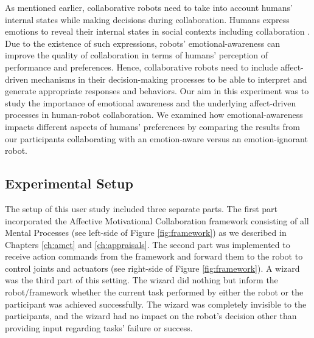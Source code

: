 \documentclass[12pt]{report}
\begin{document}
As mentioned earlier, collaborative robots need to take into account humans'
internal states while making decisions during collaboration. Humans express
emotions to reveal their internal states in social contexts including
collaboration \cite{breazeal:sociable-interactive-robots}. Due to the existence
of such expressions, robots' emotional-awareness can improve the quality of
collaboration in terms of humans' perception of performance and preferences.
Hence, collaborative robots need to include affect-driven mechanisms in their
decision-making processes to be able to interpret and generate appropriate
responses and behaviors. Our aim in this experiment was to study the importance
of emotional awareness and the underlying affect-driven processes in human-robot
collaboration. We examined how emotional-awareness impacts different aspects of
humans' preferences by comparing the results from our participants collaborating
with an emotion-aware versus an emotion-ignorant robot.

% 
% 
% 
% 
\subsection{Experimental Setup}
The setup of this user study included three separate parts. The first
part incorporated the Affective Motivational Collaboration framework consisting
of all Mental Processes (see left-side of Figure \ref{fig:framework}) as we
described in Chapters \ref{ch:amct} and \ref{ch:appraisals}. The second part was
implemented to receive action commands from the framework and forward them to
the robot to control joints and actuators (see right-side of Figure
\ref{fig:framework}). A wizard was the third part of this setting. The wizard
did nothing but inform the robot/framework whether the current task performed by
either the robot or the participant was achieved successfully. The wizard was
completely invisible to the participants, and the wizard had no impact on the
robot's decision other than providing input regarding tasks' failure or success.
\end{document}
